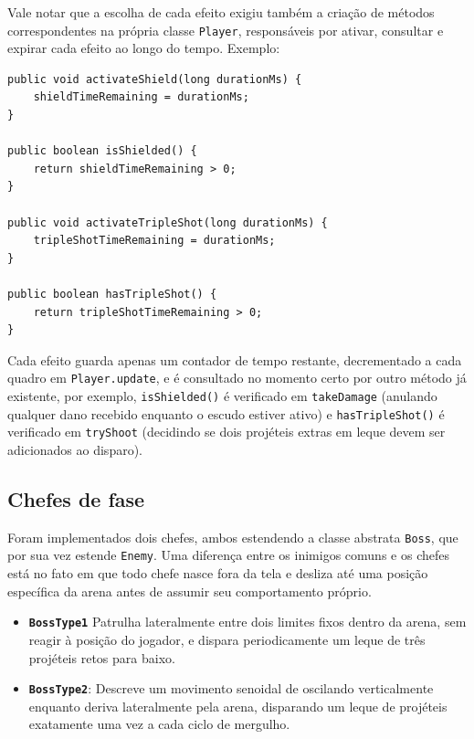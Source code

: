 Vale notar que a escolha de cada efeito exigiu também a criação de métodos correspondentes na própria
classe \texttt{Player}, responsáveis por ativar, consultar e expirar cada
efeito ao longo do tempo. Exemplo:

\begin{lstlisting}[caption={Métodos adicionados a \texttt{Player} para suportar os efeitos dos power-ups (Player.java)}]
public void activateShield(long durationMs) {
    shieldTimeRemaining = durationMs;
}

public boolean isShielded() {
    return shieldTimeRemaining > 0;
}

public void activateTripleShot(long durationMs) {
    tripleShotTimeRemaining = durationMs;
}

public boolean hasTripleShot() {
    return tripleShotTimeRemaining > 0;
}
\end{lstlisting}

Cada efeito guarda apenas um contador de tempo restante, decrementado a cada
quadro em \texttt{Player.update}, e é consultado no momento certo por outro
método já existente, por exemplo, \texttt{isShielded()} é verificado em
\texttt{takeDamage} (anulando qualquer dano recebido enquanto o escudo estiver
ativo) e \texttt{hasTripleShot()} é verificado em \texttt{tryShoot} (decidindo
se dois projéteis extras em leque devem ser adicionados ao disparo).

\subsection{Chefes de fase}

Foram implementados dois chefes, ambos estendendo a classe abstrata
\texttt{Boss}, que por sua vez estende \texttt{Enemy}. Uma diferença entre os
inimigos comuns e os chefes está no fato em que todo
chefe nasce fora da tela e desliza até uma posição específica da arena antes de assumir
seu comportamento próprio.

\begin{itemize}
    \item \textbf{\texttt{BossType1}} Patrulha
    lateralmente entre dois limites fixos dentro da arena, sem reagir à
    posição do jogador, e dispara periodicamente um leque de três projéteis
    retos para baixo.
    \item \textbf{\texttt{BossType2}}: Descreve um movimento senoidal de
    oscilando verticalmente enquanto deriva lateralmente pela arena, disparando
    um leque de projéteis exatamente uma vez a cada ciclo de mergulho.
\end{itemize}

